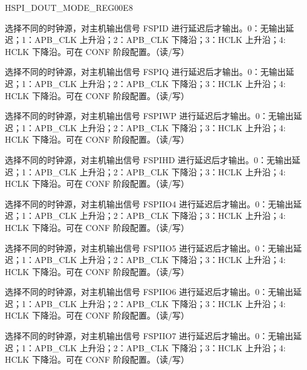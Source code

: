 \begin{register}{H}{SPI\_DOUT\_MODE\_REG}{\hexprefix{}00E8}\label{regdesc:SPIDOUTMODEREG}
%
%
%
%
%
%
%
%
%
\regnewline%
\begin{regdesc}\begin{reglist}
\label{fielddesc:SPIDOUT0MODE}\item [SPI\_DOUT0\_MODE] 选择不同的时钟源，对主机输出信号 FSPID 进行延迟后才输出。0：无输出延迟；1：APB\_CLK 上升沿；2：APB\_CLK 下降沿；3：HCLK 上升沿；4: HCLK 下降沿。可在 CONF 阶段配置。（读/写）
\label{fielddesc:SPIDOUT1MODE}\item [SPI\_DOUT1\_MODE] 选择不同的时钟源，对主机输出信号 FSPIQ 进行延迟后才输出。0：无输出延迟；1：APB\_CLK 上升沿；2：APB\_CLK 下降沿；3：HCLK 上升沿；4: HCLK 下降沿。可在 CONF 阶段配置。（读/写）
\label{fielddesc:SPIDOUT2MODE}\item [SPI\_DOUT2\_MODE] 选择不同的时钟源，对主机输出信号 FSPIWP 进行延迟后才输出。0：无输出延迟；1：APB\_CLK 上升沿；2：APB\_CLK 下降沿；3：HCLK 上升沿；4: HCLK 下降沿。可在 CONF 阶段配置。（读/写）
\label{fielddesc:SPIDOUT3MODE}\item [SPI\_DOUT3\_MODE] 选择不同的时钟源，对主机输出信号 FSPIHD 进行延迟后才输出。0：无输出延迟；1：APB\_CLK 上升沿；2：APB\_CLK 下降沿；3：HCLK 上升沿；4: HCLK 下降沿。可在 CONF 阶段配置。（读/写）
\label{fielddesc:SPIDOUT4MODE}\item [SPI\_DOUT4\_MODE] 选择不同的时钟源，对主机输出信号 FSPIIO4 进行延迟后才输出。0：无输出延迟；1：APB\_CLK 上升沿；2：APB\_CLK 下降沿；3：HCLK 上升沿；4: HCLK 下降沿。可在 CONF 阶段配置。（读/写）
\label{fielddesc:SPIDOUT5MODE}\item [SPI\_DOUT5\_MODE] 选择不同的时钟源，对主机输出信号 FSPIIO5 进行延迟后才输出。0：无输出延迟；1：APB\_CLK 上升沿；2：APB\_CLK 下降沿；3：HCLK 上升沿；4: HCLK 下降沿。可在 CONF 阶段配置。（读/写）
\label{fielddesc:SPIDOUT6MODE}\item [SPI\_DOUT6\_MODE] 选择不同的时钟源，对主机输出信号 FSPIIO6 进行延迟后才输出。0：无输出延迟；1：APB\_CLK 上升沿；2：APB\_CLK 下降沿；3：HCLK 上升沿；4: HCLK 下降沿。可在 CONF 阶段配置。（读/写）
\label{fielddesc:SPIDOUT7MODE}\item [SPI\_DOUT7\_MODE] 选择不同的时钟源，对主机输出信号 FSPIIO7 进行延迟后才输出。0：无输出延迟；1：APB\_CLK 上升沿；2：APB\_CLK 下降沿；3：HCLK 上升沿；4: HCLK 下降沿。可在 CONF 阶段配置。（读/写）
\end{reglist}\end{regdesc}
\end{register}


